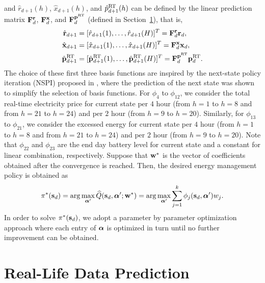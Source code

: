 {and $\hat r_{d+1}(h)$, $\hat x_{d+1}(h)$, and $\hat p^{\text{RT}}_{d+1}(h)$ can be defined by the linear prediction matrix ${\mathbf F}^{{\mathbf r}}_d$, ${\mathbf F}^{{\mathbf x}}_d$, and ${\mathbf F}^{{\mathbf p}^{\text{RT}}}_d$ (defined in Section~\ref{sec: Real-Life Data Prediction}), that is,
\begin{align}
    \hat{{\mathbf r}}_{d+1} &= [\hat r_{d+1}(1), \ldots, \hat r_{d+1}(H)]^T = {\mathbf F}^{{\mathbf r}}_d{\mathbf r}_d, \\
    \hat{{\mathbf x}}_{d+1} &= [\hat x_{d+1}(1), \ldots, \hat x_{d+1}(H)]^T = {\mathbf F}^{{\mathbf x}}_d{\mathbf x}_d, \\
    \hat{{\mathbf p}}^{\text{RT}}_{d+1} &= [\hat {{\mathbf p}}^{\text{RT}}_{d+1}(1), \ldots, \hat {{\mathbf p}}^{\text{RT}}_{d+1}(H)]^T = {\mathbf F}^{{\mathbf p}^{\text{RT}}}_d{\mathbf p}^{\text{RT}}_d.
\end{align}
The choice of these first three basis functions are inspired by the next-state policy iteration (NSPI) proposed in \cite{ramavajjala:2012}, where the prediction of the next state was shown to simplify the selection of basis functions. For $\phi_4$ to $\phi_{12}$, we consider the total real-time electricity price for current state per $4$ hour (from $h=1$ to $h=8$ and from $h=21$ to $h=24$) and per $2$ hour (from $h=9$ to $h=20$). Similarly, for $\phi_{13}$ to $\phi_{21}$, we consider the excessed energy for current state per $4$ hour (from $h=1$ to $h=8$ and from $h=21$ to $h=24$) and per $2$ hour (from $h=9$ to $h=20$). Note that $\phi_{22}$ and $\phi_{23}$ are the end day battery level for current state and a constant for linear combination, respectively. Suppose that ${\mathbf w}^*$ is the vector of coefficients obtained after the convergence is reached. Then, the desired energy management policy is obtained as
\begin{equation}
        \pi^*({\mathbf s}_d) = \arg\max_{\boldsymbol{\alpha}'} \widehat{Q}({\mathbf s}_d, \boldsymbol{\alpha}'; {\mathbf w}^*) = \arg\max_{\boldsymbol{\alpha}'} \sum_{j=1}^{k} \phi_j({\mathbf s}_d, \boldsymbol{\alpha}')w_j.
\end{equation}
In order to solve $\pi^*({\mathbf s}_d)$, we adopt a parameter by parameter optimization approach where each entry of $\boldsymbol{\alpha}$ is optimized in turn until no further improvement can be obtained.
}

\section{Real-Life Data Prediction}\label{sec: Real-Life Data Prediction}

